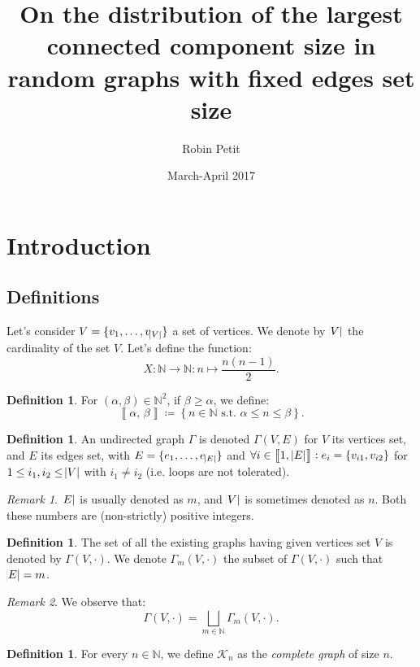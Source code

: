 \documentclass{article}
\author{Robin Petit}
\date{March-April 2017}
\title{On the distribution of the largest connected component size in random graphs with fixed edges set size}
\theoremstyle{definition}
\newtheorem{definition}[lemma]{Definition}
\theoremstyle{remark}
\newtheorem*{remark}{Remark}
\newcommand{\N}{\mathbb N}
\newcommand{\intint}[2]{\left\llbracket#1, \, #2\right\rrbracket}
\newcommand{\st}{\text{ s.t. }}
\begin{document}
\maketitle
\tableofcontents

\section{Introduction}
	\subsection{Definitions}
		Let's consider $V = \{v_1, \ldots, v_{\abs V}\}$ a set of vertices. We denote by $\abs V$ the cardinality of the set $V$. Let's define
		the function:
		\[X : \N \to \N : n \mapsto \frac {n(n-1)}2.\]

		\begin{definition} For $(\alpha, \beta) \in \N^2$, if $\beta \geq \alpha$, we define:
		\[\intint \alpha\beta \coloneqq \left\{n \in \N \st \alpha \leq n \leq \beta\right\}.\]
		\end{definition}

		\begin{definition} An undirected graph $\Gamma$ is denoted $\Gamma(V, E)$ for $V$ its vertices set, and $E$ its edges set, with $E = \{e_1, \ldots, e_{\abs E}\}$
		and $\forall i \in \intint 1{\abs E} : e_i = \{v_{i1}, v_{i2}\}$ for $1 \leq i_1, i_2 \leq \abs V$ with $i_1 \neq i_2$ (i.e. loops are not tolerated).
		\end{definition}

		\begin{remark} $\abs E$ is usually denoted as $m$, and $\abs V$ is sometimes denoted as $n$. Both these numbers are (non-strictly) positive integers.
		\end{remark}

		\begin{definition} The set of all the existing graphs having given vertices set $V$ is denoted by $\Gamma(V, \cdot)$. We denote $\Gamma_m(V, \cdot)$
		the subset of $\Gamma(V, \cdot)$ such that $\abs E = m$.
		\end{definition}

		\begin{remark} We observe that:
		\[\Gamma(V, \cdot) = \bigsqcup_{m \in \N}\Gamma_m(V, \cdot).\]
		\end{remark}

		\begin{definition} For every $n \in \N$, we define $\mathcal K_n$ as the \textit{complete graph} of size $n$.
		\end{definition}
\end{document}
